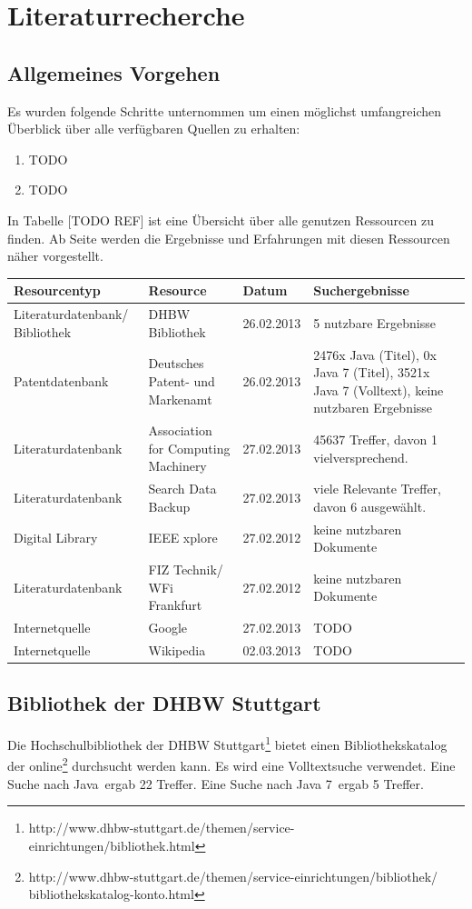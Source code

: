 \section{Literaturrecherche}

\subsection{Allgemeines Vorgehen}

Es wurden folgende Schritte unternommen um einen möglichst umfangreichen Überblick über alle verfügbaren Quellen zu erhalten:
\begin{enumerate}
\item TODO
\item TODO
\end{enumerate}
In Tabelle [TODO REF] ist eine Übersicht über alle genutzen Ressourcen zu finden. Ab Seite \pageref{startdetails} werden die Ergebnisse und Erfahrungen mit diesen Ressourcen näher vorgestellt.

\renewcommand{\arraystretch}{1.5}
\begin{table}[h!]
\centering
\begin{tabular}{p{3.6cm}|p{3.5cm}|l|p{3.5cm}}
Resourcentyp & Resource & Datum & Suchergebnisse\\
\hline
Literaturdatenbank/ Bibliothek & DHBW Bibliothek & 26.02.2013 & 5 nutzbare Ergebnisse\\
Patentdatenbank & Deutsches Patent- und Markenamt & 26.02.2013 & 2476x Java (Titel), 0x Java 7 (Titel), 3521x Java 7 (Volltext), keine nutzbaren Ergebnisse\\
Literaturdatenbank & Association for Computing Machinery & 27.02.2013 & 45637 Treffer, davon 1 vielversprechend.\\
Literaturdatenbank & Search Data Backup & 27.02.2013 & viele Relevante Treffer, davon 6 ausgewählt.\\
Digital Library & IEEE xplore & 27.02.2012 & keine nutzbaren Dokumente\\
Literaturdatenbank & FIZ Technik/ WFi Frankfurt & 27.02.2012 & keine nutzbaren Dokumente\\
Internetquelle & Google & 27.02.2013 & TODO\\
Internetquelle & Wikipedia & 02.03.2013 & TODO\\
\end{tabular}
\end{table}
\renewcommand{\arraystretch}{1}

\label{startdetails}
\subsection{Bibliothek der DHBW Stuttgart}
Die Hochschulbibliothek der DHBW Stuttgart\footnote{http://www.dhbw-stuttgart.de/themen/service-einrichtungen/bibliothek.html} bietet einen Bibliothekskatalog der online\footnote{http://www.dhbw-stuttgart.de/themen/service-einrichtungen/bibliothek/\\bibliothekskatalog-konto.html} durchsucht werden kann. Es wird eine Volltextsuche verwendet. Eine Suche nach \glqq Java\grqq ~ergab 22 Treffer. Eine Suche nach \glqq Java 7\grqq ~ergab 5 Treffer.

